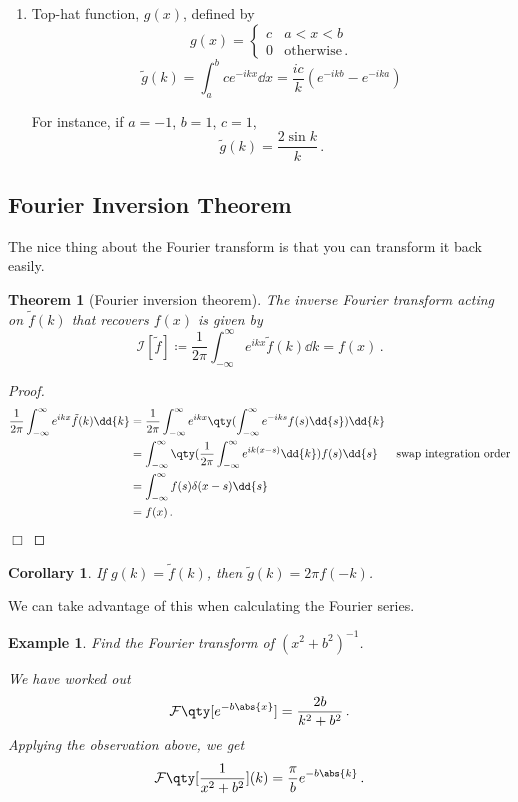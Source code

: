 \documentclass{article}
\theoremstyle{plain}\theoremheaderfont{\normalfont\itshape}\theorembodyfont{\rmfamily}\theoremseparator{.}\newtheorem*{rem}{Remark}\newtheorem*{ex}{Example}\newtheorem*{proof}{Proof}\newtheorem*{altp}{Alternative proof}
\theoremstyle{plain}\theoremheaderfont{\normalfont\bfseries}\theorembodyfont{\rmfamily}\theoremseparator{.}\newtheorem{thm}{Theorem}[section]\newtheorem{lem}[thm]{Lemma}\newtheorem{prop}[thm]{Proposition}\newtheorem*{cor}{Corollary}\newtheorem{defn}[thm]{Definition}\newtheorem{clm}[thm]{Claim}\newtheorem{clminproof}{Claim}
\theoremstyle{break}\theoremheaderfont{\normalfont\itshape}\theorembodyfont{\rmfamily}\theoremseparator{.\medskip}\newtheorem*{proofskip}{Proof}\newtheorem*{exs}{Examples}\newtheorem*{rems}{Remarks}
\theoremstyle{break}\theoremheaderfont{\normalfont\bfseries}\theorembodyfont{\rmfamily}\theoremseparator{.\medskip}\newtheorem{lemskip}[thm]{Lemma}\newtheorem{defnskip}[thm]{Definition}\newtheorem{propskip}[thm]{Proposition}\newtheorem{thmskip}[thm]{Theorem}
\numberwithin{equation}{section}
\newcommand{\qed}{\hfill\ensuremath{\Box}}
\begin{document}
\begin{enumerate}[topsep=0pt]
		If you think the proof above makes no sense, you absolutely are right. This result must be interpreted in the sense of a distribution, and is better proven using something called the Sokhotski--Plemelj identity in distribution theory. We are of course not doing this here.

		\begin{rem}
			\(ik\mathcal{F}[H(x-a)]=\mathcal{F}[\delta(x-a)]\).
		\end{rem}

		\item Top-hat function, \(g(x)\), defined by
		\[g(x)=\begin{cases}
			c & a<x<b\\
			0 & \text{otherwise}\,.
		\end{cases}\]
		\[\tilde{g}(k)=\int_{a}^{b}ce^{-ikx}\dd{x}=\frac{ic}{k}(e^{-ikb}-e^{-ika})\]
		
		For instance, if \(a=-1\), \(b=1\), \(c=1\),
		\[\tilde{g}(k)=\frac{2\sin k}{k}\,.\]
	\end{enumerate}
	
	\subsection{Fourier Inversion Theorem}
	The nice thing about the Fourier transform is that you can transform it back easily.
	\begin{thm}[Fourier inversion theorem]
		The inverse Fourier transform acting on \(\tilde{f}(k)\) that recovers \(f(x)\) is given by
		\[\mathcal{I}[\tilde{f}]\coloneqq\frac{1}{2\pi}\int_{-\infty}^{\infty}e^{ikx}\tilde{f}(k)\dd{k}=f(x)\,.\]
	\end{thm}
	
	\begin{proof}
		\begin{align*}
			\frac{1}{2\pi}\int_{-\infty}^{\infty}e^{ikx}\tilde{f}(k)\dd{k}&=\frac{1}{2\pi}\int_{-\infty}^{\infty}e^{ikx}\qty(\int_{-\infty}^{\infty}e^{-iks}f(s)\dd{s})\dd{k}\\
			&=\int_{-\infty}^{\infty}\qty(\frac{1}{2\pi}\int_{-\infty}^{\infty}e^{ik(x-s)}\dd{k})f(s)\dd{s} & \text{swap integration order}\\
			&=\int_{-\infty}^{\infty}f(s)\delta(x-s)\dd{s}\\
			&=f(x)\,.
		\end{align*}\qed
	\end{proof}
	
	\begin{cor}
		If \(g(k)=\tilde{f}(k)\), then \(\tilde{g}(k)=2\pi f(-k)\).
	\end{cor}
	We can take advantage of this when calculating the Fourier series.
	\begin{ex}
		Find the Fourier transform of \((x^2+b^2)^{-1}\).

		We have worked out
		\[\mathcal{F}\qty[e^{-b\abs{x}}]=\frac{2b}{k^2+b^2}\,.\]
		Applying the observation above, we get
		\[\mathcal{F}\qty[\frac{1}{x^2+b^2}](k)=\frac{\pi}{b}e^{-b\abs{k}}\,.\]
	\end{ex}
	
\end{document}
